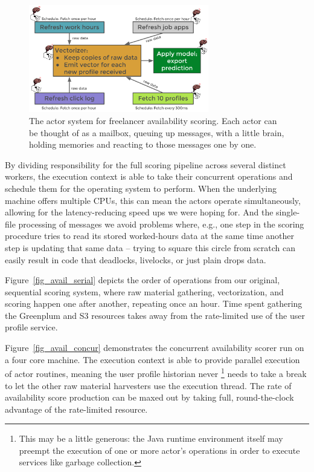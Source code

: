 \documentclass{article}
\begin{document}
\begin{figure}[h]
\includegraphics[width=0.7\textwidth]{fig/tex/availability_system.png}
\centering
\caption{The actor system for freelancer availability scoring. Each actor can be thought of
as a mailbox, queuing up messages, with a little brain, holding memories and reacting to 
those messages one by one.}
\label{fig_av_system}
\end{figure}

By dividing responsibility for the full scoring pipeline across several distinct workers,
the execution context is able to take their concurrent operations and schedule them
for the operating system to perform. When the underlying machine offers multiple
CPUs, this can mean the actors operate simultaneously, allowing for the 
latency-reducing speed ups we were hoping for. And the single-file
processing of messages we avoid problems where, e.g., one step in the scoring 
procedure tries to read its stored worked-hours data at the same time another
step is updating that same data -- trying to square this circle from scratch
can easily result in code that deadlocks, livelocks, or just plain drops data.

Figure~\ref{fig_avail_serial} depicts the order of operations from our original,
sequential scoring system, where raw material gathering, vectorization, and
scoring happen one after another, repeating once an hour. Time spent gathering
the Greenplum and S3 resources takes away from the rate-limited use of
the user profile service.

Figure~\ref{fig_avail_concur} demonstrates the concurrent availability scorer
run on a four core machine. The execution context is able to provide parallel
execution of actor routines, meaning the user profile historian never \footnote{
This may be a little generous: the Java runtime environment itself may preempt
the execution of one or more actor's operations in order to execute services like
garbage collection.} needs to take a break to let the other raw material harvesters 
use the execution thread. The rate of availability score production can be maxed out 
by taking full, round-the-clock advantage of the rate-limited resource.
\end{document}
